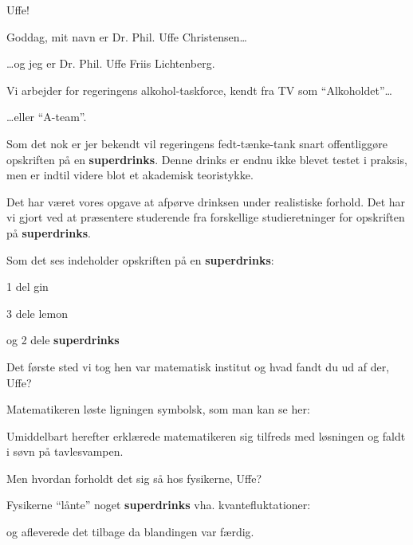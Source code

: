 \documentclass[a4paper,11pt]{article}
\newcommand{\sd}{\textbf{superdrinks}}
\begin{document}
\begin{sketch}
  
   Uffe! 
  
   Goddag, mit navn er Dr. Phil. Uffe Christensen\ldots
  
   \ldots{}og jeg er Dr. Phil. Uffe Friis Lichtenberg.
  
   Vi arbejder for regeringens alkohol-taskforce, kendt fra TV
  som ``Alkoholdet''\ldots
  
   \ldots{}eller ``A-team''.
  
  
   Som det nok er jer bekendt vil regeringens fedt-tænke-tank
  snart offentliggøre opskriften på en \sd. Denne drinks er endnu ikke
  blevet testet i praksis, men er indtil videre blot et akademisk
  teoristykke.
  
   Det har været vores opgave at afpørve drinksen under
  realistiske forhold. Det har vi gjort ved at præsentere studerende
  fra forskellige studieretninger for opskriften på \sd.
  
   Som det ses indeholder opskriften på en \sd:
  
  
   1 del gin
  
   3 dele lemon
  
   og 2 dele \sd
  
   Det første sted vi tog hen var matematisk institut og hvad
  fandt du ud af der, Uffe?
  
   Matematikeren løste ligningen symbolsk, som man kan se her:
  
  
   Umiddelbart herefter erklærede matematikeren sig tilfreds
  med løsningen og faldt i søvn på tavlesvampen.
  
   Men hvordan forholdt det sig så hos fysikerne, Uffe?
  
   Fysikerne ``lånte'' noget \sd{} vha. kvantefluktationer:
  
  
   og afleverede det tilbage da blandingen var færdig.
  

\end{sketch}
\end{document}

